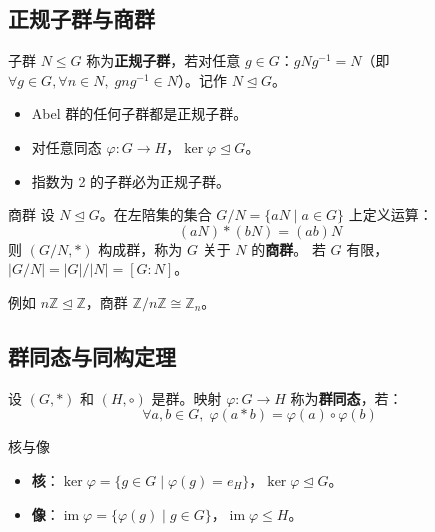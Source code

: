 \subsection{正规子群与商群}

\begin{mydefinition}{}
子群 $N \leq G$ 称为\textbf{正规子群}，若对任意 $g \in G$：$gNg^{-1} = N$（即 $\forall g\in G,\forall n\in N,\; gng^{-1}\in N$）。记作 $N \trianglelefteq G$。
\end{mydefinition}

\begin{itemize}
    \item Abel 群的任何子群都是正规子群。
    \item 对任意同态 $\varphi: G \to H$，$\ker\varphi \trianglelefteq G$。
    \item 指数为 2 的子群必为正规子群。
\end{itemize}

\begin{mydefinition}{商群}
设 $N \trianglelefteq G$。在左陪集的集合 $G/N = \{aN \mid a \in G\}$ 上定义运算：
\[
(aN)*(bN) = (ab)N
\]
则 $(G/N, *)$ 构成群，称为 $G$ 关于 $N$ 的\textbf{商群}。
若 $G$ 有限，$|G/N| = |G|/|N| = [G:N]$。
\end{mydefinition}

例如 $n\mathbb{Z} \trianglelefteq \mathbb{Z}$，商群 $\mathbb{Z}/n\mathbb{Z} \cong \mathbb{Z}_n$。

\subsection{群同态与同构定理}

\begin{mydefinition}{}
设 $(G,*)$ 和 $(H,\circ)$ 是群。映射 $\varphi: G\to H$ 称为\textbf{群同态}，若：
\[
\forall a,b\in G,\; \varphi(a*b) = \varphi(a)\circ \varphi(b)
\]
\end{mydefinition}

\begin{mydefinition}{核与像}
\begin{itemize}
    \item \textbf{核}：$\ker\varphi = \{g\in G \mid \varphi(g)=e_H\}$，$\ker\varphi \trianglelefteq G$。
    \item \textbf{像}：$\operatorname{im}\varphi = \{\varphi(g) \mid g\in G\}$，$\operatorname{im}\varphi \leq H$。
\end{itemize}
\end{mydefinition}

